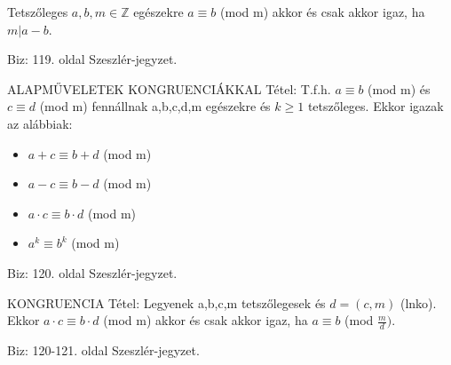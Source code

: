 \documentclass[]{article}
\begin{document}
\begin{framed}
Tetszőleges  $a,b,m\in\mathbb{Z}$ egészekre $a \equiv b$ (mod m) akkor és csak akkor igaz, ha $m|a-b$.
\end{framed}
\begin{leftbar}
Biz: 119. oldal Szeszlér-jegyzet.
\end{leftbar}
\begin{framed}
ALAPMŰVELETEK KONGRUENCIÁKKAL Tétel: T.f.h. $a \equiv b$ (mod m) és $c \equiv d$ (mod m) fennállnak a,b,c,d,m egészekre és $k \geq 1$ tetszőleges. Ekkor igazak az alábbiak:
\begin{itemize}
\item $a + c \equiv b + d$ (mod m)
\item $a - c \equiv b - d$ (mod m)
\item $a \cdot c \equiv b \cdot d$ (mod m)
\item $a^k \equiv b^k$ (mod m)
\end{itemize}
\end{framed}
\begin{leftbar}
Biz: 120. oldal Szeszlér-jegyzet.
\end{leftbar}
\begin{framed}
KONGRUENCIA Tétel: Legyenek a,b,c,m tetszőlegesek és $d = (c,m)$ (lnko). Ekkor $a\cdot c \equiv b\cdot d$ (mod m) akkor és csak akkor igaz, ha $a \equiv b$ (mod $\frac{m}{d})$.
\end{framed}
\begin{leftbar}
Biz: 120-121. oldal Szeszlér-jegyzet.
\end{leftbar}
\end{document}
